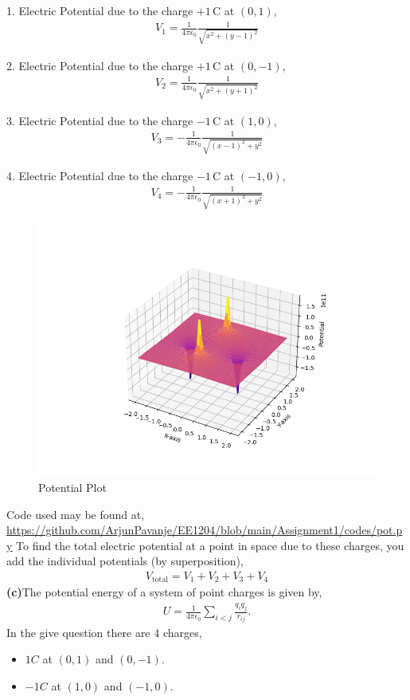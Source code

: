 \documentclass{article}
\begin{document}
1. Electric Potential due to the charge $ +1\,\mathrm{C} $ at $ (0, 1) $,
   \begin{align*}
   V_1 = \frac{1}{4\pi\epsilon_0} \frac{1}{\sqrt{x^2 + (y-1)^2}}
   \end{align*}

2. Electric Potential due to the charge $ +1\,\mathrm{C} $ at $ (0, -1) $,
   \begin{align*}
   V_2 = \frac{1}{4\pi\epsilon_0} \frac{1}{\sqrt{x^2 + (y+1)^2}}
   \end{align*}

3. Electric Potential due to the charge $ -1\,\mathrm{C} $ at $ (1, 0) $,
   \begin{align*}
   V_3 = -\frac{1}{4\pi\epsilon_0} \frac{1}{\sqrt{(x-1)^2 + y^2}}
   \end{align*}

4. Electric Potential due to the charge $ -1\,\mathrm{C} $ at $ (-1, 0) $,
   \begin{align*}
   V_4 = -\frac{1}{4\pi\epsilon_0} \frac{1}{\sqrt{(x+1)^2 + y^2}}
   \end{align*}
\begin{figure}[h!]
   \centering
   \includegraphics[width=0.6\columnwidth]{figs/pot.png}
    \caption{{Potential Plot}}
   \label{label}
\end{figure}
\pagebreak
Code used may be found at, \newline \url{https://github.com/ArjunPavanje/EE1204/blob/main/Assignment1/codes/pot.py} \newline
To find the total electric potential at a point in space due to these charges, you add the individual potentials (by superposition),
\begin{align*}
V_{\text{total}} = V_1 + V_2 + V_3 + V_4
\end{align*}
   \textbf{(c)}The potential energy of a system of point charges is given by,
\begin{align*}
U = \frac{1}{4\pi\epsilon_0} \sum_{i < j} \frac{q_i q_j}{r_{ij}}.
\end{align*}
In the give question there are 4 charges,
\begin{itemize}
    \item $1C$ at $(0,1)$ and $(0,-1)$.
    \item $-1C$ at $(1,0)$ and $(-1,0)$.
\end{itemize}
\end{document}
